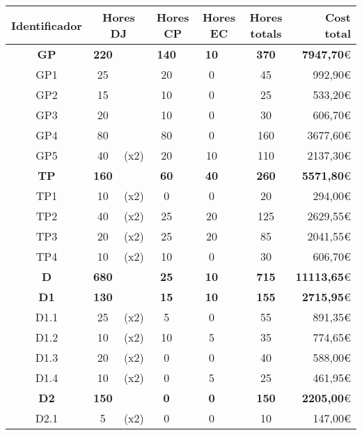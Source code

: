 \begin{table}[H]
\begin{tabular}{|c|cc|cc|cc|c|r|}
\hline
\textbf{Identificador} & \multicolumn{2}{c|}{\textbf{Hores DJ}} & \multicolumn{2}{c|}{\textbf{Hores CP}} & \multicolumn{2}{c|}{\textbf{Hores EC}} & \textbf{Hores totals}   & \textbf{Cost total}      \\ \hline
\textbf{GP}	&	\textbf{220}	&	&	\textbf{140}	&	&	\textbf{10}	&	&	\textbf{370}	&	\textbf{7947,70}\euro	\\	\hline
GP1	&	25	&	&	20	&	&	0	&	&	45	&	992,90\euro	\\	\hline
GP2	&	15	&	&	10	&	&	0	&	&	25	&	533,20\euro	\\	\hline
GP3	&	20	&	&	10	&	&	0	&	&	30	&	606,70\euro	\\	\hline
GP4	&	80	&	&	80	&	&	0	&	&	160	&	3677,60\euro	\\	\hline
GP5	&	40	&	{\footnotesize	(x2)}	&	20	&	&	10	&	&	110	&	2137,30\euro	\\	\hline
\textbf{TP}	&	\textbf{160}	&	&	\textbf{60}	&	&	\textbf{40}	&	&	\textbf{260}	&	\textbf{5571,80}\euro	\\	\hline
TP1	&	10	&	{\footnotesize	(x2)}	&	0	&	&	0	&	&	20	&	294,00\euro	\\	\hline
TP2	&	40	&	{\footnotesize	(x2)}	&	25	&	&	20	&	&	125	&	2629,55\euro	\\	\hline
TP3	&	20	&	{\footnotesize	(x2)}	&	25	&	&	20	&	&	85	&	2041,55\euro	\\	\hline
TP4	&	10	&	{\footnotesize	(x2)}	&	10	&	&	0	&	&	30	&	606,70\euro	\\	\hline
\textbf{D}	&	\textbf{680}	&	&	\textbf{25}	&	&	\textbf{10}	&	&	\textbf{715}	&	\textbf{11113,65}\euro	\\	\hline
\textbf{D1}	&	\textbf{130}	&	&	\textbf{15}	&	&	\textbf{10}	&	&	\textbf{155}	&	\textbf{2715,95}\euro	\\	\hline
D1.1	&	25	&	{\footnotesize	(x2)}	&	5	&	&	0	&	&	55	&	891,35\euro	\\	\hline
D1.2	&	10	&	{\footnotesize	(x2)}	&	10	&	&	5	&	&	35	&	774,65\euro	\\	\hline
D1.3	&	20	&	{\footnotesize	(x2)}	&	0	&	&	0	&	&	40	&	588,00\euro	\\	\hline
D1.4	&	10	&	{\footnotesize	(x2)}	&	0	&	&	5	&	&	25	&	461,95\euro	\\	\hline
\textbf{D2}	&	\textbf{150}	&	&	\textbf{0}	&	&	\textbf{0}	&	&	\textbf{150}	&	\textbf{2205,00}\euro	\\	\hline
D2.1	&	5	&	{\footnotesize	(x2)}	&	0	&	&	0	&	&	10	&	147,00\euro	\\	\hline

\end{tabular}
\end{table}
